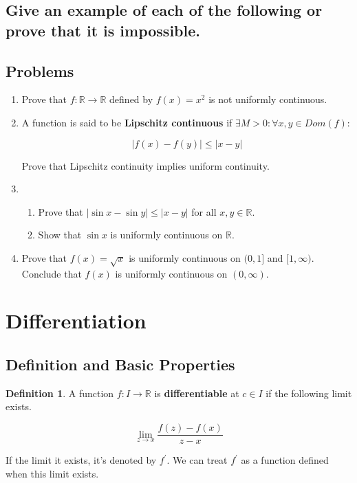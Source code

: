 \documentclass{article}
\theoremstyle{definition}
\newtheorem{definition}{Definition}
\newcommand{\R}{\mathbb{R}}
\begin{document}
\subsection{Give an example of each of the following or prove that it is impossible.}

\subsection{Problems}

\begin{enumerate}
    \item Prove that $f: \R \xrightarrow{} \R$ defined by $f(x) = x^{2}$ is not uniformly continuous.

    \item A function is said to be \textbf{Lipschitz continuous} if $\exists M > 0: \forall x,y \in Dom(f):$

    \[ \lvert f(x) - f(y) \rvert \leq \lvert x - y \rvert\]

    Prove that Lipschitz continuity implies uniform continuity.
    \item 
    
    \begin{enumerate}
        \item Prove that $\lvert \sin x - \sin y \rvert \leq \lvert x - y \rvert $ for all $x,y \in \R$.
        \item Show that $\sin x$ is uniformly continuous on $\R$.
    \end{enumerate}

    \item Prove that $f(x) = \sqrt{x}$ is uniformly continuous on $(0,1]$ and $[1,\infty)$. Conclude that $f(x)$ is uniformly continuous on $(0,\infty)$.
    
\end{enumerate}

\newpage

\section{Differentiation}

\subsection{Definition and Basic Properties}

\begin{definition}
    A function $f: I \xrightarrow{} \R$ is \textbf{differentiable} at $c \in I$
    if the following limit exists.

    \[ \lim_{z \to x} \frac{f(z) - f(x)}{z-x} \]

    If the limit it exists, it's denoted by $f^{\prime}$. We can treat $f^{\prime}$
    as a function defined when this limit exists.
\end{definition}
\end{document}
